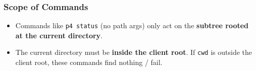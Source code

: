 \subsubsection*{Scope of Commands}

\begin{itemize}
\item Commands like \texttt{p4 status} (no path args) only act on
        the \textbf{subtree rooted at the current directory}.\\
\item The current directory must be \textbf{inside the client
        root}. If \texttt{cwd} is outside the client root, these
        commands find nothing / fail.\\
\end{itemize}
